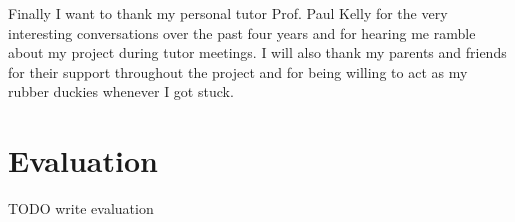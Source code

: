 \documentclass[11pt %
              ]{article}
\theoremstyle{plain}
\theoremstyle{definition}
\theoremstyle{remark}
\begin{document}
Finally I want to thank my personal tutor Prof. Paul Kelly for the very interesting conversations
over the past four years and for hearing me ramble about my project during tutor meetings. I will
also thank my parents and friends for their support throughout the project and for being willing
to act as my rubber duckies whenever I got stuck.
\vfill
\hspace{0pt}

\newpage
\tableofcontents

\newpage
\pagestyle{fancy}
\fancyhf{}
\lhead{\nouppercase{\leftmark}}
\fancyfoot[C]{\thepage}
\setlength{\headheight}{13.59999pt}
\addtolength{\topmargin}{-1.59999pt}




\newpage


\newpage


\newpage
\section{Evaluation}

{\color{orange} TODO write evaluation}

\newpage


\newpage


\end{document}
